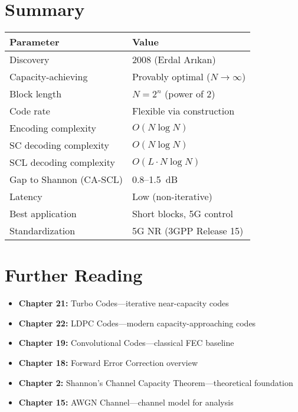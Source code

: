 \section{Summary}

\begin{center}
\begin{tabular}{@{}ll@{}}
\toprule
\textbf{Parameter} & \textbf{Value} \\
\midrule
Discovery & 2008 (Erdal Ar{\i}kan) \\
Capacity-achieving & Provably optimal ($N \to \infty$) \\
Block length & $N = 2^n$ (power of 2) \\
Code rate & Flexible via construction \\
Encoding complexity & $O(N \log N)$ \\
SC decoding complexity & $O(N \log N)$ \\
SCL decoding complexity & $O(L \cdot N \log N)$ \\
Gap to Shannon (CA-SCL) & 0.8--1.5~dB \\
Latency & Low (non-iterative) \\
Best application & Short blocks, 5G control \\
Standardization & 5G NR (3GPP Release 15) \\
\bottomrule
\end{tabular}
\end{center}

\section{Further Reading}

\begin{itemize}
\item \textbf{Chapter 21:} Turbo Codes---iterative near-capacity codes
\item \textbf{Chapter 22:} LDPC Codes---modern capacity-approaching codes
\item \textbf{Chapter 19:} Convolutional Codes---classical FEC baseline
\item \textbf{Chapter 18:} Forward Error Correction overview
\item \textbf{Chapter 2:} Shannon's Channel Capacity Theorem---theoretical foundation
\item \textbf{Chapter 15:} AWGN Channel---channel model for analysis
\end{itemize}
